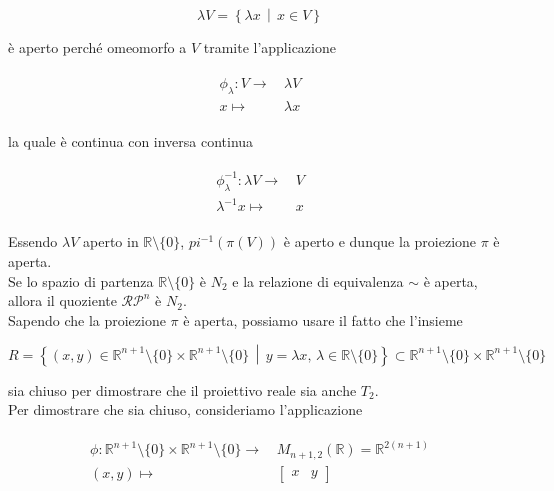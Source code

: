 \begin{equation}
	\lambda V = \left\{ \lambda x \, \middle| \, x \in V \right\}
\end{equation}

è aperto perché omeomorfo a $ V $ tramite l'applicazione

\begin{align}
	\begin{split}
		\phi_{\lambda} : V \to& \, \lambda V\\
		x \mapsto& \, \lambda x
	\end{split}
\end{align}

la quale è continua con inversa continua

\begin{align}
	\begin{split}
		\phi_{\lambda}^{-1} : \lambda V \to& \, V\\
		\lambda^{-1} x \mapsto& \, x
	\end{split}
\end{align}

Essendo $ \lambda V $ aperto in $ \mathbb{R} \setminus \{0\} $, $ pi^{-1}(\pi(V)) $ è aperto e dunque la proiezione $ \pi $ è aperta.\\
Se lo spazio di partenza $ \mathbb{R} \setminus \{0\} $ è $ N_{2} $ e la relazione di equivalenza $ \sim $ è aperta, allora il quoziente $ \mathcal{RP}^{n} $ è $ N_{2} $.\\
Sapendo che la proiezione $ \pi $ è aperta, possiamo usare il fatto che l'insieme

\begin{equation}
	R = \left\{ (x,y) \in \mathbb{R}^{n+1} \setminus \{0\} \times \mathbb{R}^{n+1} \setminus \{0\} \, \middle| \, y=\lambda x, \, \lambda \in \mathbb{R} \setminus \{0\} \right\} \subset \mathbb{R}^{n+1} \setminus \{0\} \times \mathbb{R}^{n+1} \setminus \{0\}
\end{equation}

sia chiuso per dimostrare che il proiettivo reale sia anche $ T_{2} $.\\
Per dimostrare che sia chiuso, consideriamo l'applicazione

\begin{align}
	\begin{split}
		\phi : \mathbb{R}^{n+1} \setminus \{0\} \times \mathbb{R}^{n+1} \setminus \{0\} \to& \, M_{n+1,2}(\mathbb{R}) = \mathbb{R}^{2(n+1)}\\
		(x,y) \mapsto& \, \begin{bmatrix} x & y \end{bmatrix}
	\end{split}
\end{align}

